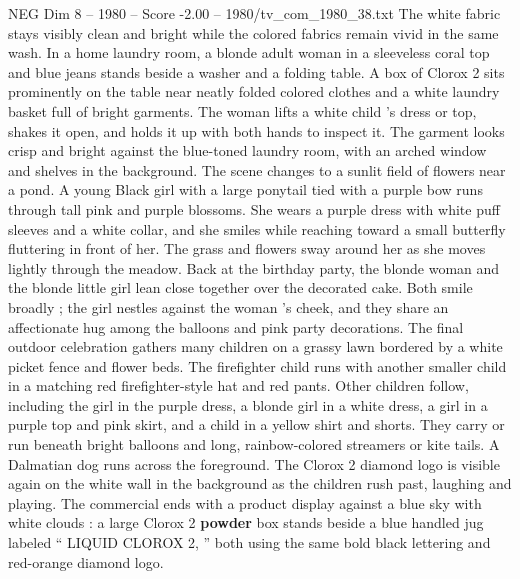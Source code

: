 \begin{textsample}{NEG Dim 8 – 1980 – Score -2.00 – 1980/tv\_com\_1980\_38.txt}
The white fabric stays visibly clean and bright while the colored fabrics remain vivid in the same wash.
In a home laundry room, a blonde adult woman in a sleeveless coral top and blue jeans stands beside a washer and a folding table.
A box of Clorox 2 sits prominently on the table near neatly folded colored clothes and a white laundry basket full of bright garments.
The woman lifts a white child ’s dress or top, shakes it open, and holds it up with both hands to inspect it.
The garment looks crisp and bright against the blue-toned laundry room, with an arched window and shelves in the background.
The scene changes to a sunlit field of flowers near a pond.
A young Black girl with a large ponytail tied with a purple bow runs through tall pink and purple blossoms.
She wears a purple dress with white puff sleeves and a white collar, and she smiles while reaching toward a small butterfly fluttering in front of her.
The grass and flowers sway around her as she moves lightly through the meadow.
Back at the birthday party, the blonde woman and the blonde little girl lean close together over the decorated cake.
Both smile broadly ; the girl nestles against the woman ’s cheek, and they share an affectionate hug among the balloons and pink party decorations.
The final outdoor celebration gathers many children on a grassy lawn bordered by a white picket fence and flower beds.
The firefighter child runs with another smaller child in a matching red firefighter-style hat and red pants.
Other children follow, including the girl in the purple dress, a blonde girl in a white dress, a girl in a purple top and pink skirt, and a child in a yellow shirt and shorts.
They carry or run beneath bright balloons and long, rainbow-colored streamers or kite tails.
A Dalmatian dog runs across the foreground.
The Clorox 2 diamond logo is visible again on the white wall in the background as the children rush past, laughing and playing.
The commercial ends with a product display against a blue sky with white clouds : a large Clorox 2 \textbf{powder} box stands beside a blue handled jug labeled “ LIQUID CLOROX 2, ” both using the same bold black lettering and red-orange diamond logo.

\end{textsample}
